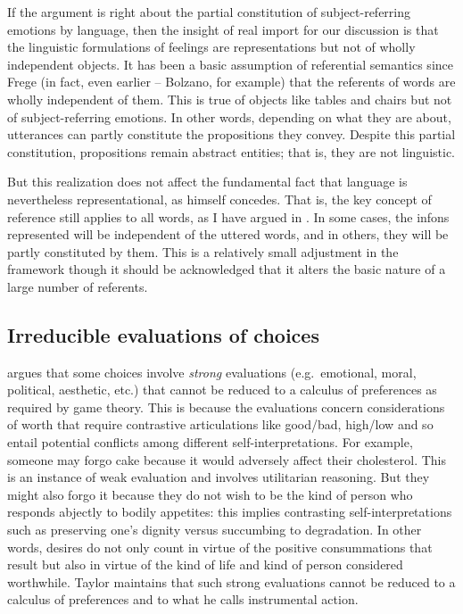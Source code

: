 If the argument is right about the partial constitution of subject-referring emotions by language, then the insight of real import for our discussion is that the linguistic formulations of feelings are representations but not of wholly independent objects. It has been a basic assumption of referential semantics since Frege (in fact, even earlier -- Bolzano, for example) that the referents of words are wholly independent of them. This is true of objects like tables and chairs but not of subject-referring emotions. In other words, depending on what they are about, utterances can partly constitute the propositions they convey. Despite this partial constitution, propositions remain abstract entities; that is, they are not linguistic.

But this realization does not affect the fundamental fact that language is nevertheless representational, as \citet[101]{taylor:cp} himself concedes. That is, the key concept of reference still applies to all words, as I have argued in \citet{parikh:le}. In some cases, the infons represented will be independent of the uttered words, and in others, they will be partly constituted by them. This is a relatively small adjustment in the framework though it should be acknowledged that it alters the basic nature of a large number of referents.


\subsection{Irreducible evaluations of choices}

\citet{taylor:wha} argues that some choices involve \emph{strong} evaluations (e.g.\ emotional, moral, political, aesthetic, etc.) that cannot be reduced to a calculus of preferences as required by game theory. This is because the evaluations concern considerations of worth that require contrastive articulations like good/bad, high/low and so entail potential conflicts among different self-interpretations. For example, someone may forgo cake because it would adversely affect their cholesterol. This is an instance of weak evaluation and involves utilitarian reasoning. But they might also forgo it because they do not wish to be the kind of person who responds abjectly to bodily appetites: this implies contrasting self-interpretations such as preserving one's dignity versus succumbing to degradation. In other words, desires do not only count in virtue of the positive consummations that result but also in virtue of the kind of life and kind of person considered worthwhile. Taylor maintains that such strong evaluations cannot be reduced to a calculus of preferences and to what he calls instrumental action.


